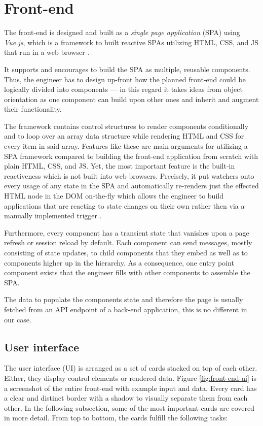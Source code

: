 \documentclass[12pt,a4paper]{report}
\begin{document}
\section{Front-end} \label{sect:implementation-front-end}

The front-end is designed and built as a \textit{single page application} (SPA)
using \textit{Vue.js}, which is a framework to built reactive SPAs utilizing
HTML, CSS, and JS that run in a web browser \cite{vuejs}.

It supports and encourages to build the SPA as multiple, reusable components.
Thus, the engineer has to design up-front how the planned front-end could be
logically divided into components --- in this regard it takes ideas from
object orientation as one component can build upon other ones and inherit
and augment their functionality.

The framework contains control structures to render components conditionally
and to loop over an array data structure while rendering HTML and CSS for
every item in said array. Features like these are main arguments for utilizing
a SPA framework compared to building the front-end application from scratch
with plain HTML, CSS, and JS.
Yet, the most important feature is the built-in reactiveness which is not built
into web browsers. Precisely, it put watchers onto every usage of any state
in the SPA and automatically re-renders just the effected HTML node in the DOM
on-the-fly which allows the engineer to build applications that are reacting
to state changes on their own rather then via a manually implemented trigger
\cite{vuejs}.

Furthermore, every component has a transient state that vanishes upon a
page refresh or session reload by default. Each component can send messages,
mostly consisting of state updates, to child components that they embed as well
as to components higher up in the hierarchy.
As a consequence, one entry point component exists that the engineer fills
with other components to assemble the SPA.

The data to populate the components state and therefore the page is usually
fetched from an API endpoint of a back-end application, this is no different
in our case.


\subsection{User interface}

The user interface (UI) is arranged as a set of cards stacked on top of each
other. Either, they display control elements or rendered data.
Figure \ref{fig:front-end-ui} is a screenshot of the entire front-end with
example input and data. Every card has a clear and distinct border with
a shadow to visually separate them from each other.
In the following subsection, some of the most important cards are covered
in more detail. From top to bottom, the cards fulfill the following tasks:
\end{document}
